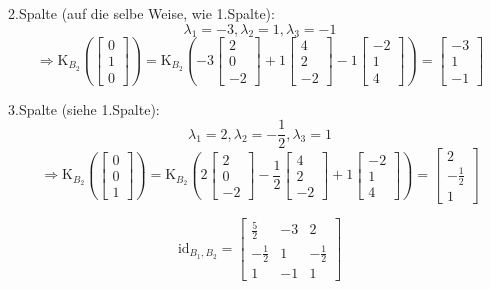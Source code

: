 \documentclass[a4paper, 11pt]{article}
\begin{document}
2.Spalte (auf die selbe Weise, wie 1.Spalte):
$$\lambda_1 = -3, \lambda_2 = 1, \lambda_3 = -1$$
$$\Rightarrow \text{K}_{B_2}\left(\begin{bmatrix} 0 \\ 1 \\ 0 \end{bmatrix}\right) =
\text{K}_{B_2}\left(- 3\begin{bmatrix} 2 \\ 0 \\ -2 \end{bmatrix} +
    1\begin{bmatrix} 4 \\ 2 \\ -2 \end{bmatrix} -
    1\begin{bmatrix} -2 \\ 1 \\ 4 \end{bmatrix}\right) =
    \begin{bmatrix} -3 \\ 1 \\ -1 \end{bmatrix}$$

\pagebreak

3.Spalte (siehe 1.Spalte):
$$\lambda_1 = 2, \lambda_2 = -\frac{1}{2}, \lambda_3 = 1$$
$$\Rightarrow \text{K}_{B_2}\left(\begin{bmatrix} 0 \\ 0 \\ 1 \end{bmatrix}\right) =
\text{K}_{B_2}\left(2\begin{bmatrix} 2 \\ 0 \\ -2 \end{bmatrix} -
\frac{1}{2}\begin{bmatrix} 4 \\ 2 \\ -2 \end{bmatrix} +
1\begin{bmatrix} -2 \\ 1 \\ 4 \end{bmatrix}\right)
= \begin{bmatrix} 2 \\ -\frac{1}{2} \\ 1 \end{bmatrix}$$

$$\text{id}_{B_1,B_2} = \begin{bmatrix} \frac{5}{2} & -3 & 2 \\ -\frac{1}{2} & 1 & -\frac{1}{2} \\ 1 & -1 & 1 \end{bmatrix}$$
\end{document}
